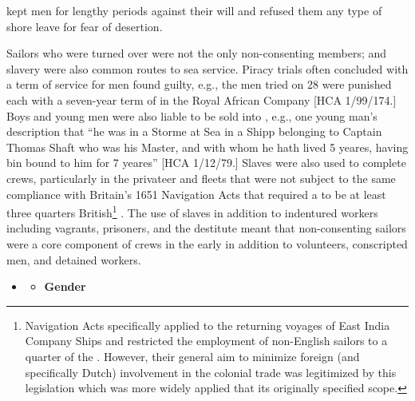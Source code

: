 kept men for lengthy periods against their will and refused them any type of shore leave for fear of desertion. 

Sailors who were turned over were not the only non-consenting  members;  and slavery were also common routes to sea service. Piracy trials often concluded with a term of service for men found guilty, e.g., the men tried on 28 \citealt{March1722} were punished each with a seven-year term of  in the Royal African Company [HCA 1/99/174.] Boys and young men were also liable to be sold into , e.g., one young man’s description that “he was in a Storme at Sea in a Shipp belonging to Captain Thomas Shaft who was his Master, and with whom he hath lived 5 yeares, having bin bound to him for 7 yeares” [HCA 1/12/79.] Slaves were also used to complete crews, particularly in the privateer and  fleets that were not subject to the same compliance with Britain's 1651 Navigation Acts that required a  to be at least three quarters British\footnote{\citealt{The1651} Navigation Acts specifically applied to the returning voyages of East India Company Ships and restricted the employment of non-English sailors to a quarter of the . However, their general aim to minimize foreign (and specifically Dutch) involvement in the colonial trade was legitimized by this legislation which was more widely applied that its originally specified scope.} . The use of slaves in addition to indentured workers including vagrants, prisoners, and the destitute meant that non-consenting sailors were a core component of crews in the early  in addition to volunteers, conscripted men, and detained workers. 


\begin{itemize}
\item 
\begin{itemize}
\item \textbf{Gender}
\end{itemize}
\end{itemize}

